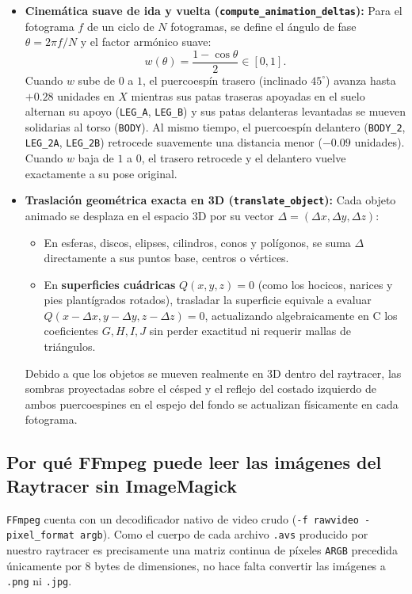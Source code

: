 \documentclass[11pt,letterpaper]{article}
\begin{document}
\begin{itemize}[leftmargin=1.5em]
    \item \textbf{Cinemática suave de ida y vuelta (\texttt{compute\_animation\_deltas}):}
    Para el fotograma $f$ de un ciclo de $N$ fotogramas, se define el ángulo de fase $\theta = 2\pi f / N$ y el factor armónico suave:
    \[
        w(\theta) = \frac{1 - \cos\theta}{2} \in [0, 1].
    \]
    Cuando $w$ sube de $0$ a $1$, el puercoespín trasero (inclinado $45^\circ$) avanza hasta $+0.28$ unidades en $X$ mientras sus patas traseras apoyadas en el suelo alternan su apoyo (\texttt{LEG\_A}, \texttt{LEG\_B}) y sus patas delanteras levantadas se mueven solidarias al torso (\texttt{BODY}). Al mismo tiempo, el puercoespín delantero (\texttt{BODY\_2}, \texttt{LEG\_2A}, \texttt{LEG\_2B}) retrocede suavemente una distancia menor ($-0.09$ unidades). Cuando $w$ baja de $1$ a $0$, el trasero retrocede y el delantero vuelve exactamente a su pose original.

    \item \textbf{Traslación geométrica exacta en 3D (\texttt{translate\_object}):}
    Cada objeto animado se desplaza en el espacio 3D por su vector $\Delta = (\Delta x, \Delta y, \Delta z)$:
    \begin{itemize}
        \item En esferas, discos, elipses, cilindros, conos y polígonos, se suma $\Delta$ directamente a sus puntos base, centros o vértices.
        \item En \textbf{superficies cuádricas} $Q(x,y,z) = 0$ (como los hocicos, narices y pies plantígrados rotados), trasladar la superficie equivale a evaluar $Q(x - \Delta x, y - \Delta y, z - \Delta z) = 0$, actualizando algebraicamente en C los coeficientes $G, H, I, J$ sin perder exactitud ni requerir mallas de triángulos.
    \end{itemize}
    Debido a que los objetos se mueven realmente en 3D dentro del raytracer, las sombras proyectadas sobre el césped y el reflejo del costado izquierdo de ambos puercoespines en el espejo del fondo se actualizan físicamente en cada fotograma.
\end{itemize}

\subsection{Por qué FFmpeg puede leer las imágenes del Raytracer sin ImageMagick}

\texttt{FFmpeg} cuenta con un decodificador nativo de video crudo (\texttt{-f rawvideo -pixel\_format argb}). Como el cuerpo de cada archivo \texttt{.avs} producido por nuestro raytracer es precisamente una matriz continua de píxeles \texttt{ARGB} precedida únicamente por 8 bytes de dimensiones, no hace falta convertir las imágenes a \texttt{.png} ni \texttt{.jpg}.
\end{document}

